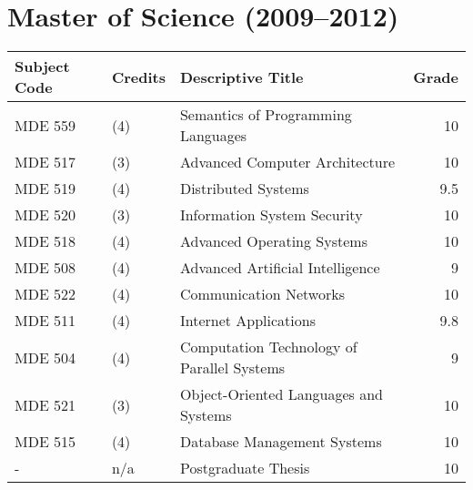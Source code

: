 \documentclass[11pt,a4paper]{article}
\begin{document}
\section{Master of Science (2009--2012)}

\begin{center}
  \small
  \begin{longtable}{lllr}
    \toprule
    Subject Code & Credits & Descriptive Title & Grade \\
    \midrule
    MDE 559 & (4) & Semantics of Programming Languages & 10 \\
    MDE 517 & (3) & Advanced Computer Architecture & 10 \\
    MDE 519 & (4) & Distributed Systems & 9.5 \\
    MDE 520 & (3) & Information System Security & 10 \\
    MDE 518 & (4) & Advanced Operating Systems & 10 \\
    MDE 508 & (4) & Advanced Artificial Intelligence & 9 \\
    MDE 522 & (4) & Communication Networks & 10 \\
    MDE 511 & (4) & Internet Applications & 9.8 \\
    MDE 504 & (4) & Computation Technology of Parallel Systems & 9 \\
    MDE 521 & (3) & Object-Oriented Languages and Systems & 10 \\
    MDE 515 & (4) & Database Management Systems & 10 \\
    \midrule
    - & n/a & Postgraduate Thesis & 10 \\
    \bottomrule
  \end{longtable}
\end{center}
\end{document}
